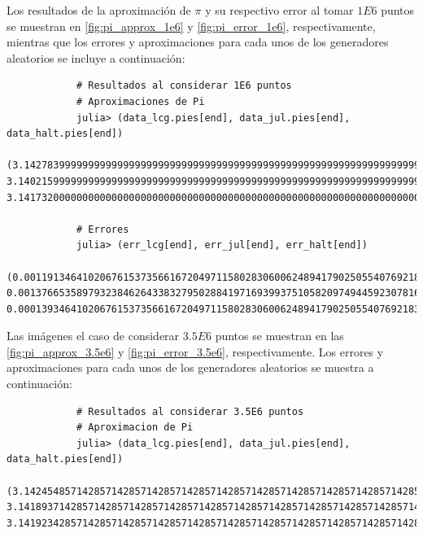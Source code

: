 \begin{enumerate}
\begin{solution}
        Los resultados de la aproximación de $\pi$ y su respectivo error al tomar $1E6$ puntos se muestran en \cref{fig:pi_approx_1e6} y \cref{fig:pi_error_1e6}, respectivamente, mientras que los errores y aproximaciones para cada unos de los generadores aleatorios se incluye a continuación:
        \begin{verbatim}
            # Resultados al considerar 1E6 puntos
            # Aproximaciones de Pi
            julia> (data_lcg.pies[end], data_jul.pies[end], data_halt.pies[end])
            (3.142783999999999999999999999999999999999999999999999999999999999999999999999995, 3.140215999999999999999999999999999999999999999999999999999999999999999999999989, 3.141732000000000000000000000000000000000000000000000000000000000000000000000005)

            # Errores
            julia> (err_lcg[end], err_jul[end], err_halt[end])
            (0.0011913464102067615373566167204971158028306006248941790250554076921835937137966, 0.001376653589793238462643383279502884197169399375105820974944592307816406286208964, 0.0001393464102067615373566167204971158028306006248941790250554076921835937138070732)
        \end{verbatim}

        Las imágenes el caso de considerar $3.5E6$ puntos se muestran en las \cref{fig:pi_approx_3.5e6} y \cref{fig:pi_error_3.5e6}, respectivamente. Los errores y aproximaciones para cada unos de los generadores aleatorios se muestra a continuación:
        \begin{verbatim}
            # Resultados al considerar 3.5E6 puntos
            # Aproximacion de Pi
            julia> (data_lcg.pies[end], data_jul.pies[end], data_halt.pies[end])
            (3.14245485714285714285714285714285714285714285714285714285714285714285714285715, 3.141893714285714285714285714285714285714285714285714285714285714285714285714276, 3.141923428571428571428571428571428571428571428571428571428571428571428571428585)


\end{verbatim}
\end{solution}
\end{enumerate}
